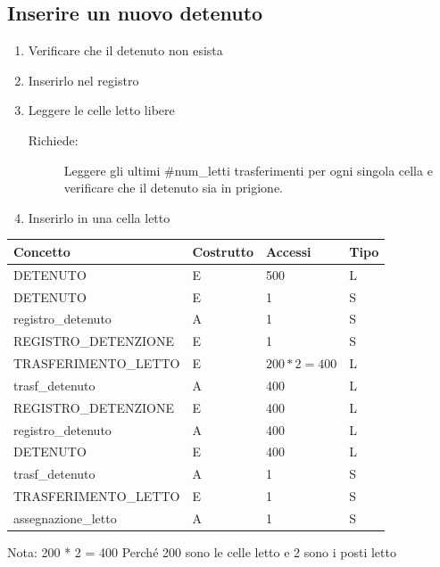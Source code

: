 \documentclass[a4paper,12pt]{report}
\begin{document}
\subsection{Inserire un nuovo detenuto} \label{inserimento}
\begin{enumerate}
    \item Verificare che il detenuto non esista
    \item Inserirlo nel registro
    \item Leggere le celle letto libere
        \begin{description}
            \item[Richiede:] Leggere gli ultimi \#num\_letti trasferimenti per ogni singola cella e verificare che il detenuto sia in prigione.
        \end{description}
    \item Inserirlo in una cella letto
\end{enumerate}
\begin{table}[H]
\begin{tabular}{p{5cm} p{2cm} p{1cm} p{1cm}}
\hline
Concetto & Costrutto & Accessi & Tipo \\ \hline
DETENUTO & E & 500 & L \\
DETENUTO & E & 1 & S \\
registro\_detenuto & A & 1 & S \\
REGISTRO\_DETENZIONE & E & 1 & S \\
TRASFERIMENTO\_LETTO & E & \(200 * 2 = 400\) & L \\
trasf\_detenuto & A & 400 & L \\
REGISTRO\_DETENZIONE & E & 400 & L \\
registro\_detenuto & A & 400 & L \\
DETENUTO & E & 400 & L \\
trasf\_detenuto & A & 1 & S \\
TRASFERIMENTO\_LETTO & E & 1 & S \\
assegnazione\_letto & A & 1 & S \\
\end{tabular}
\end{table}
Nota: 200 * 2 = 400 Perché 200 sono le celle letto e 2 sono i posti letto
%
\end{document}
